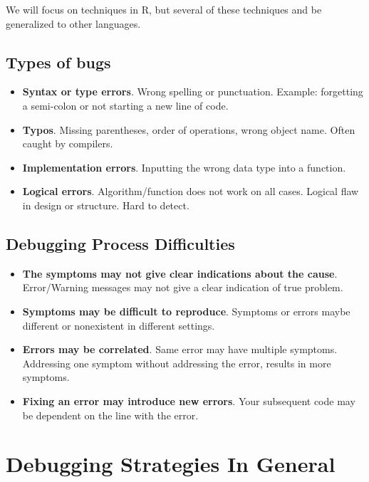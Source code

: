 \documentclass[
]{book}
\begin{document}
We will focus on techniques in R, but several of these techniques and be generalized to other languages.

\hypertarget{types-of-bugs}{%
\subsection*{Types of bugs}\label{types-of-bugs}}

\begin{itemize}
\item
  \textbf{Syntax or type errors}. Wrong spelling or punctuation. Example: forgetting a semi-colon or not starting a new line of code.
\item
  \textbf{Typos}. Missing parentheses, order of operations, wrong object name. Often caught by compilers.
\item
  \textbf{Implementation errors}. Inputting the wrong data type into a function.
\item
  \textbf{Logical errors}. Algorithm/function does not work on all cases. Logical flaw in design or structure. Hard to detect.
\end{itemize}

\hypertarget{debugging-process-difficulties}{%
\subsection*{Debugging Process Difficulties}\label{debugging-process-difficulties}}

\begin{itemize}
\item
  \textbf{The symptoms may not give clear indications about the cause}. Error/Warning messages may not give a clear indication of true problem.
\item
  \textbf{Symptoms may be difficult to reproduce}. Symptoms or errors maybe different or nonexistent in different settings.
\item
  \textbf{Errors may be correlated}. Same error may have multiple symptoms. Addressing one symptom without addressing the error, results in more symptoms.
\item
  \textbf{Fixing an error may introduce new errors}. Your subsequent code may be dependent on the line with the error.
\end{itemize}

\hypertarget{debugging-strategies-in-general}{%
\section{Debugging Strategies In General}\label{debugging-strategies-in-general}}
\end{document}

